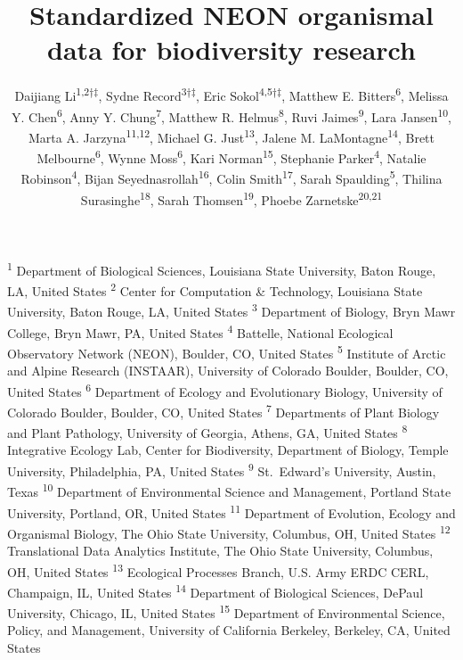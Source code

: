 \documentclass[
  12pt,
]{article}
\title{Standardized NEON organismal data for biodiversity research}
\author{Daijiang Li\textsuperscript{1,2†‡}, Sydne Record\textsuperscript{3†‡}, Eric Sokol\textsuperscript{4,5†‡}, Matthew E. Bitters\textsuperscript{6}, Melissa Y. Chen\textsuperscript{6}, Anny Y. Chung\textsuperscript{7}, Matthew R. Helmus\textsuperscript{8}, Ruvi Jaimes\textsuperscript{9}, Lara Jansen\textsuperscript{10}, Marta A. Jarzyna\textsuperscript{11,12}, Michael G. Just\textsuperscript{13}, Jalene M. LaMontagne\textsuperscript{14}, Brett Melbourne\textsuperscript{6}, Wynne Moss\textsuperscript{6}, Kari Norman\textsuperscript{15}, Stephanie Parker\textsuperscript{4}, Natalie Robinson\textsuperscript{4}, Bijan Seyednasrollah\textsuperscript{16}, Colin Smith\textsuperscript{17}, Sarah Spaulding\textsuperscript{5}, Thilina Surasinghe\textsuperscript{18}, Sarah Thomsen\textsuperscript{19}, Phoebe Zarnetske\textsuperscript{20,21}}
\date{\DIFdelbegin \DIFdel{08 April, 2021}\DIFdelend \DIFaddbegin \DIFadd{01 February, 2022}\DIFaddend }
\makeatletter
\newcommand\iraggedright{%
  \let\\\@centercr\@rightskip\@flushglue \rightskip\@rightskip
  \leftskip\z@skip}
\makeatother
\begin{document}
\maketitle

\iraggedright

\footnotesize

\textsuperscript{1} Department of Biological Sciences, Louisiana State University, Baton Rouge, LA, United States\\
\textsuperscript{2} Center for Computation \& Technology, Louisiana State University, Baton Rouge, LA, United States\\
\textsuperscript{3} Department of Biology, Bryn Mawr College, Bryn Mawr, PA, United States\\
\textsuperscript{4} Battelle, National Ecological Observatory Network (NEON), Boulder, CO, United States\\
\textsuperscript{5} Institute of Arctic and Alpine Research (INSTAAR), University of Colorado Boulder, Boulder, CO, United States\\
\textsuperscript{6} Department of Ecology and Evolutionary Biology, University of Colorado Boulder, Boulder, CO, United States\\
\textsuperscript{7} Departments of Plant Biology and Plant Pathology, University of Georgia, Athens, GA, United States\\
\textsuperscript{8} Integrative Ecology Lab, Center for Biodiversity, Department of Biology, Temple University, Philadelphia, PA, United States\\
\textsuperscript{9} St.~Edward's University, Austin, Texas\\
\textsuperscript{10} Department of Environmental Science and Management, Portland State University, Portland, OR, United States\\
\textsuperscript{11} Department of Evolution, Ecology and Organismal Biology, The Ohio State University, Columbus, OH, United States\\
\textsuperscript{12} Translational Data Analytics Institute, The Ohio State University, Columbus, OH, United States\\
\textsuperscript{13} Ecological Processes Branch, U.S. Army ERDC CERL, Champaign, IL, United States\\
\textsuperscript{14} Department of Biological Sciences, DePaul University, Chicago, IL, United States\\
\textsuperscript{15} Department of Environmental Science, Policy, and Management, University of California Berkeley, Berkeley, CA, United States\\
\end{document}
